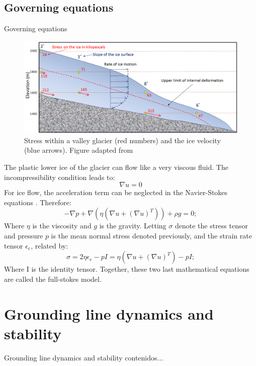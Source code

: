 \documentclass[11pt]{beamer}
\begin{document}
	\subsection{Governing equations}
		\begin{frame}[allowframebreaks]{Governing equations}
		\justifying
			\begin{figure}
				\centering
				\includegraphics[scale=0.3]{../fig/ice_flow.png}
				\caption{Stress within a valley glacier (red numbers) and the ice velocity (blue arrows). Figure adapted from \cite{earle2015physical}}
				\label{Flow_ice}
			\end{figure}
		The plastic lower ice of the glacier can flow like a very viscous fluid. The incompressibility condition leads to:
		\begin{equation}
			\nabla u=0
		\end{equation}
		For ice flow, the acceleration term can be neglected in the Navier-Stokes equations \cite[]{hutter1982mathematical}. Therefore:
		\begin{equation}
			-\nabla p+\nabla (\eta (\nabla u+(\nabla u)^T))+\rho g = 0;
		\end{equation}
		Where $\eta$ is the viscosity and $g$ is the gravity. Letting $\sigma$ denote the stress tensor and pressure $p$ is the mean normal stress denoted previously, and the strain rate tensor $\epsilon_{e}$, related by:
		\begin{equation}
			\sigma=2\eta \epsilon_{e}-pI = \eta (\nabla u+(\nabla u)^T)-pI; 
		\end{equation}
		Where I is the identity tensor. Together, these two last mathematical equations are called the full-stokes model.
		\end{frame}
	\section{Grounding line dynamics and stability}
		\begin{frame}{Grounding line dynamics and stability}
		contenidos...
		\end{frame}
\end{document}
